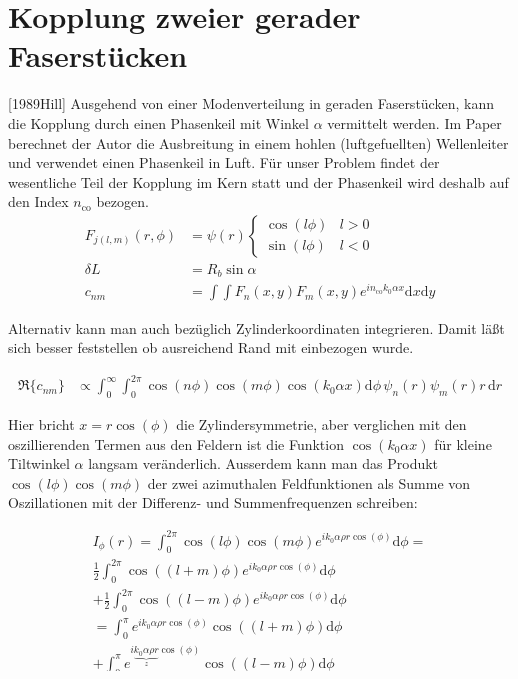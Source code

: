 \documentclass[DIV19,twocolumn]{scrartcl}
\def\({\left(}
\def\){\right)}
\newcommand{\nco}{n_\textrm{co}}
\begin{document}
\section{Kopplung zweier gerader Faserst\"ucken}
[1989Hill]
Ausgehend von einer Modenverteilung in geraden Faserst\"ucken, kann
die Kopplung durch einen Phasenkeil mit Winkel $\alpha$ vermittelt
werden. Im Paper berechnet der Autor die Ausbreitung in einem hohlen
(luftgefuellten) Wellenleiter und verwendet einen Phasenkeil in
Luft. F\"ur unser Problem findet der wesentliche Teil der Kopplung im
Kern statt und der Phasenkeil wird deshalb auf den Index $\nco$
bezogen.
\begin{align}
  F_{j(l,m)}(r,\phi) &= \psi(r) 
  \begin{cases}
    \cos(l \phi) & l>0\\  
    \sin(l \phi) & l<0
  \end{cases} \\
  \delta L &= R_b \sin\alpha\\
  c_{nm}&=\int\!\!\!\int\! F_n(x,y)F_m(x,y) e^{i\nco k_0\alpha x} \textrm{d}x \textrm{d}y
\end{align}

Alternativ kann man auch bez\"uglich Zylinderkoordinaten
integrieren. Damit l\"a\ss t sich besser feststellen ob ausreichend
Rand mit einbezogen wurde.

\begin{align}
  \Re\{c_{nm}\}&\propto\int_0^{\infty}\!\!\!\!\int_0^{2\pi}\!\!\!\!\!\! \cos(n\phi)\cos(m\phi) \cos(k_0\alpha x) \textrm{d}\phi\, \psi_n(r) \psi_m(r) r\, \textrm{d}r 
\end{align}

Hier bricht $x=r \cos(\phi)$ die Zylindersymmetrie, aber verglichen
mit den oszillierenden Termen aus den Feldern ist die Funktion
$\cos(k_0\alpha x)$ f\"ur kleine Tiltwinkel $\alpha$ langsam
ver\"anderlich. Ausserdem kann man das Produkt
$\cos(l\phi)\cos(m\phi)$ der zwei azimuthalen Feldfunktionen als Summe
von Oszillationen mit der Differenz- und Summenfrequenzen schreiben:



\begin{align}
  I_\phi(r) = \int_0^{2\pi}\!\!\!\!\!\! \cos(l\phi)\cos(m\phi) e^{ik_0\alpha\rho r\cos(\phi)} \textrm{d}\phi = \nonumber \\
  \frac{1}{2}\int_0^{2\pi}\!\!\!\!\!\! \cos\((l+m)\phi\) e^{ik_0\alpha\rho r\cos(\phi)} \textrm{d}\phi  \nonumber \\
  + \frac{1}{2}\int_0^{2\pi}\!\!\!\!\!\! \cos\((l-m)\phi\) e^{ik_0\alpha\rho r\cos(\phi)} \textrm{d}\phi \nonumber \\
  =  \int_0^{\pi}\! e^{ik_0\alpha\rho r\cos(\phi)} \cos\((l+m)\phi\) \textrm{d}\phi  \nonumber \\
  + \int_0^{\pi}\! e^{i\underbrace{k_0\alpha\rho r}_z\cos(\phi)} \cos\((l-m)\phi\)  \textrm{d}\phi
\end{align}
\end{document}
